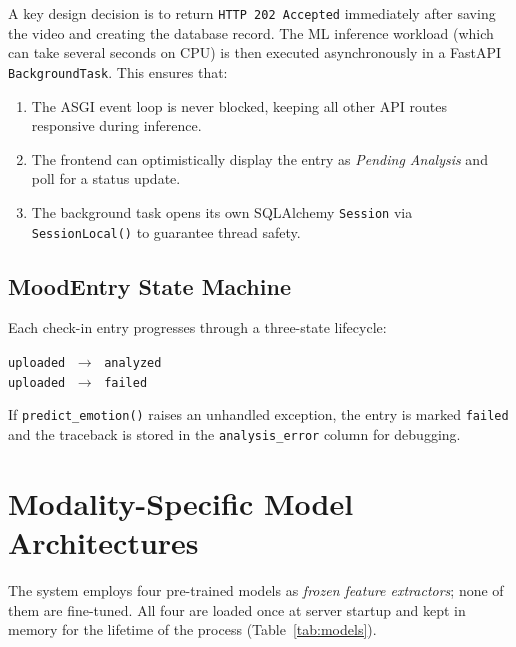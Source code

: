 \documentclass[12pt,a4paper]{article}
\begin{document}
A key design decision is to return \texttt{HTTP~202~Accepted} immediately
after saving the video and creating the database record. The ML inference
workload (which can take several seconds on CPU) is then executed
asynchronously in a FastAPI \texttt{BackgroundTask}. This ensures that:

\begin{enumerate}[leftmargin=2em]
  \item The ASGI event loop is never blocked, keeping all other API routes
        responsive during inference.
  \item The frontend can optimistically display the entry as
        \textit{Pending Analysis} and poll for a status update.
  \item The background task opens its own SQLAlchemy \texttt{Session} via
        \texttt{SessionLocal()} to guarantee thread safety.
\end{enumerate}

\subsection{MoodEntry State Machine}

Each check-in entry progresses through a three-state lifecycle:

\begin{center}
\texttt{uploaded} $\;\longrightarrow\;$ \texttt{analyzed}\\
\texttt{uploaded} $\;\longrightarrow\;$ \texttt{failed}
\end{center}

If \texttt{predict\_emotion()} raises an unhandled exception, the entry is
marked \texttt{failed} and the traceback is stored in the
\texttt{analysis\_error} column for debugging.

\section{Modality-Specific Model Architectures}
\label{sec:models}

The system employs four pre-trained models as \textit{frozen feature
extractors}; none of them are fine-tuned. All four are loaded once at server
startup and kept in memory for the lifetime of the process
(Table~\ref{tab:models}).
\end{document}
